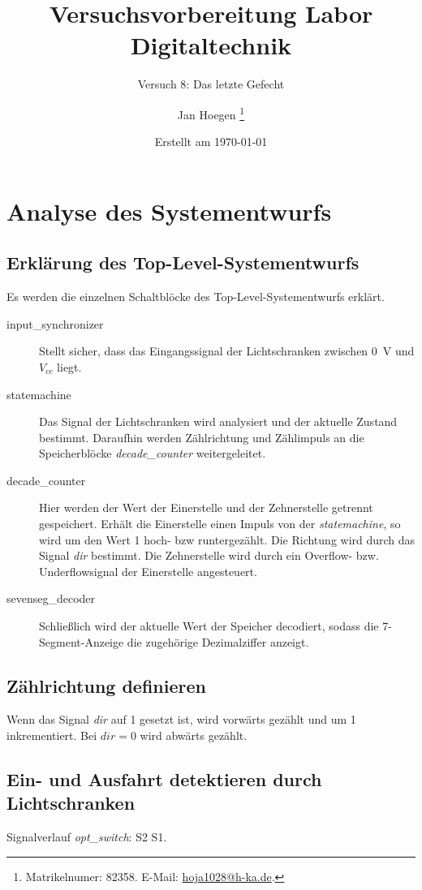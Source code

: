 \documentclass[
    paper=a4,
    parskip=half,
]{scrartcl}
\title{Versuchsvorbereitung Labor Digitaltechnik}
\subtitle{Versuch 8: Das letzte Gefecht}
\author{%
    Jan Hoegen%
    \thanks{Matrikelnumer: 82358. E-Mail: \href{mailto:hoja1028@h-ka.de}{hoja1028@h-ka.de}.}
}
\date{Erstellt am \today}
\begin{document}
\maketitle

\tableofcontents

\newpage

\section{Analyse des Systementwurfs}

    \subsection{Erklärung des Top-Level-Systementwurfs}
        Es werden die einzelnen Schaltblöcke des Top-Level-Systementwurfs erklärt.

        \begin{description}
            \item[input\_synchronizer] Stellt sicher, dass das Eingangssignal der Lichtschranken zwischen \SI{0}{\volt} und $V_{cc}$ liegt.
            \item[statemachine] Das Signal der Lichtschranken wird analysiert und der aktuelle Zustand bestimmt. Daraufhin werden Zählrichtung und Zählimpuls an die Speicherblöcke \textit{decade\_counter} weitergeleitet.
            \item[decade\_counter] Hier werden der Wert der Einerstelle und der Zehnerstelle getrennt gespeichert. Erhält die Einerstelle einen Impuls von der \textit{statemachine}, so wird um den Wert 1 hoch- bzw runtergezählt.   Die Richtung wird durch das Signal \textit{dir} bestimmt. Die Zehnerstelle wird durch ein Overflow- bzw. Underflowsignal der Einerstelle angesteuert.
            \item[sevenseg\_decoder] Schließlich wird der aktuelle Wert der Speicher decodiert, sodass die 7-Segment-Anzeige die zugehörige Dezimalziffer anzeigt.
        \end{description}

    \subsection{Zählrichtung definieren}
        Wenn das Signal \textit{dir} auf 1 gesetzt ist, wird vorwärts gezählt und um 1 inkrementiert. Bei $dir=0$ wird abwärts gezählt.

    \subsection{Ein- und Ausfahrt detektieren durch Lichtschranken}
        Signalverlauf \textit{opt\_switch}: S2 S1.
        
\end{document}
